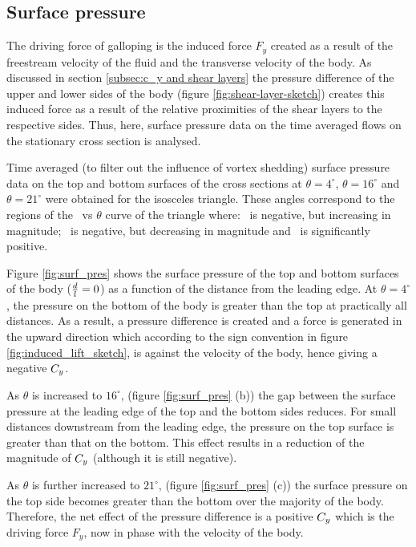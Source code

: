 \subsection{Surface pressure}
\label{subsec:cross-sec-surface pressure}

The driving force of galloping is the induced force $F_y$ created as a result of the freestream velocity of the fluid and the transverse velocity of the body. As discussed in section \ref{subsec:c_y and shear layers} the pressure difference of the upper and lower sides of the body (figure \ref{fig:shear-layer-sketch}) creates this induced force as a result of the relative proximities of the shear layers to the respective sides. Thus, here, surface pressure data on the time averaged flows on the stationary cross section is analysed.

Time averaged (to filter out the influence of vortex shedding) surface pressure data  on the top and bottom surfaces of the cross sections at $\theta=4^{\circ}$, $\theta=16^{\circ}$ and $\theta=21^{\circ}$ were obtained for the isosceles triangle. These angles correspond to the regions of the \cy\ vs $\theta$ curve of the triangle where: \cy\ is negative, but increasing in magnitude; \cy\ is negative, but decreasing in magnitude and \cy\ is significantly positive.   
 
 

 Figure \ref{fig:surf_pres} shows the surface pressure of the top and bottom surfaces of the body ($\frac{d}{l}=0$) as a function of the distance from the leading edge. At $\theta=4^{\circ}$, the pressure on the bottom of the body is greater than the top at practically all distances. As a result, a pressure difference is created and a force is generated in the upward direction which according to the sign convention in figure \ref{fig:induced_lift_sketch}, is against the velocity of the body, hence giving a negative $C_{y}$.

As $\theta$ is increased to $16^{\circ}$, (figure \ref{fig:surf_pres} (b)) the gap between the surface pressure at the leading edge of the top and the bottom sides reduces. For small distances downstream from the leading edge, the pressure on the top surface is greater than that on the bottom. This effect results in a reduction of the magnitude of $C_{y}$ (although it is still negative).

As $\theta$ is further increased to $21^{\circ}$, (figure \ref{fig:surf_pres} (c)) the surface pressure on the top side becomes greater than the bottom over the majority of the body. Therefore, the net effect of the pressure difference is a positive $C_{y}$ which is the driving force $F_y$, now in phase with the velocity of the body.



